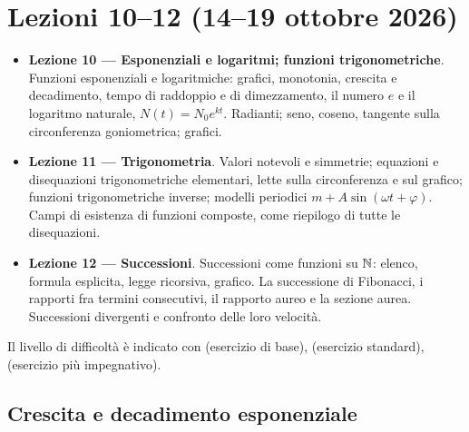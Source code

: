 \chapter{Lezioni 10--12 (14--19 ottobre 2026)}

\begin{vuoto}{}
\begin{itemize}
\item[\bul] \textbf{Lezione 10 --- Esponenziali e logaritmi; funzioni trigonometriche}. Funzioni esponenziali e logaritmiche: grafici, monotonia, crescita e decadimento, tempo di raddoppio e di dimezzamento, il numero $e$ e il logaritmo naturale, $N(t)=N_0e^{kt}$. Radianti; seno, coseno, tangente sulla circonferenza goniometrica; grafici.
\item[\bul] \textbf{Lezione 11 --- Trigonometria}. Valori notevoli e simmetrie; equazioni e disequazioni trigonometriche elementari, lette sulla circonferenza e sul grafico; funzioni trigonometriche inverse; modelli periodici $m+A\sin(\omega t+\varphi)$. Campi di esistenza di funzioni composte, come riepilogo di tutte le disequazioni.
\item[\bul] \textbf{Lezione 12 --- Successioni}. Successioni come funzioni su $\mathbb N$: elenco, formula esplicita, legge ricorsiva, grafico. La successione di Fibonacci, i rapporti fra termini consecutivi, il rapporto aureo e la sezione aurea. Successioni divergenti e confronto delle loro velocità.
\end{itemize}
\end{vuoto}

Il livello di difficoltà è indicato con  (esercizio di base),  (esercizio standard),  (esercizio più impegnativo).

\section{Crescita e decadimento esponenziale}


